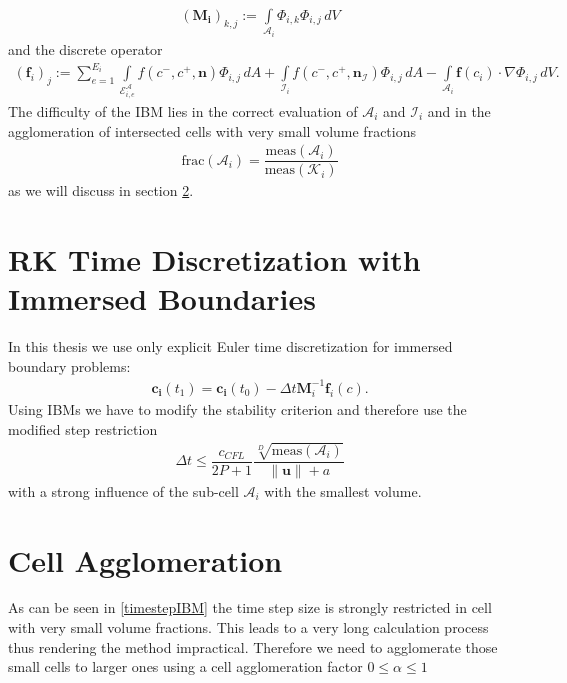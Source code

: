 	\begin{align}
		(\mathbf{M_i})_{k,j} := \int\limits_{\mathcal{A}_i}\Phi_{i,k}\Phi_{i,j}\, dV
	\end{align}
	and the discrete operator 
	\begin{align}
		(\mathbf{f}_i)_j := \sum_{e=1}^{E_i}\int\limits_{\mathcal{E}_{i,e}^\mathcal{A}} f \left( c^-, c^+, \mathbf{n} \right) \Phi_{i,j} \, dA + \int\limits_{\mathcal{I}_{i}} f \left( c^-, c^+, \mathbf{n}_\mathcal{I} \right) \Phi_{i,j} \, dA - \int\limits_{\mathcal{A}_i} \boldsymbol{f}\left(c_i\right) \cdot \nabla\Phi_{i,j} \, dV.
	\end{align}
	The difficulty of the IBM lies in the correct evaluation of $\mathcal{A}_i$ and $\mathcal{I}_i$ and in the agglomeration of intersected cells with very small volume fractions 
	\begin{align}
		\text{frac}(\mathcal{A}_i) = \dfrac{\text{meas}(\mathcal{A}_i)}{\text{meas}(\mathcal{K}_i)}
	\end{align} 
	as we will discuss in section \ref{cellAgglomeration}.
	
	\section{RK Time Discretization with Immersed Boundaries}
	In this thesis we use only explicit Euler time discretization for immersed boundary problems:
	\begin{align}
		\mathbf{c_i}(t_1) = \mathbf{c_i}(t_0)-\Delta t \mathbf{M}_i^{-1} \mathbf{f}_i (c).
	\end{align}
	Using IBMs we have to modify the stability criterion and therefore use the modified step restriction
	\begin{align}
		\Delta t \leq \dfrac{c_{CFL}}{2P+1} \dfrac{\sqrt[D]{\text{meas}(\mathcal{A}_i)}}{\|\mathbf{u} \| + a}
		\label{timestepIBM}
	\end{align}
	with a strong influence of the sub-cell $\mathcal{A}_i$ with the smallest volume.
	
	\section{Cell Agglomeration}
	\label{cellAgglomeration}
	As can be seen in \ref{timestepIBM} the time step size is strongly restricted in cell with very small volume fractions. This leads to a very long calculation process thus rendering the method impractical. Therefore we need to agglomerate those small cells to larger ones using a cell agglomeration factor $0 \leq \alpha \leq 1$
	
	
	
	